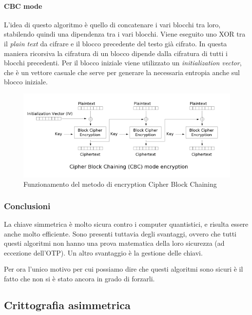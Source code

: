 \paragraph{CBC mode}

L'idea di questo algoritmo è quello di concatenare i vari blocchi tra loro,
stabilendo quindi una dipendenza tra i vari blocchi. Viene eseguito uno XOR tra
il \textit{plain text} da cifrare e il blocco precedente del testo già cifrato.
In questa maniera ricorsiva la cifratura di un blocco dipende dalla cifratura di
tutti i blocchi precedenti. Per il blocco iniziale viene utilizzato un
\textit{initialization vector}, che è un vettore casuale che serve per generare
la necessaria entropia anche sul blocco iniziale.

\begin{figure}[H]
\centering
\includegraphics[scale=0.65]{res/img/cbc.png}
\caption{Funzionamento del metodo di encryption Cipher Block Chaining}
\label{fig:password:cbc}
\end{figure}

\subsubsection{Conclusioni}

La chiave simmetrica è molto sicura contro i computer quantistici, e risulta
essere anche molto efficiente. Sono presenti tuttavia degli svantaggi, ovvero
che tutti questi algoritmi non hanno una prova matematica della loro
sicurezza (ad eccezione dell'OTP). Un altro svantaggio è la gestione delle
chiavi.

Per ora l'unico motivo per cui possiamo dire che questi algoritmi sono sicuri è
il fatto che non si è stato ancora in grado di forzarli.

\subsection{Crittografia asimmetrica}

